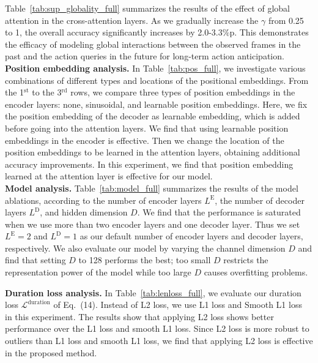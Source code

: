 Table~\ref{tab:sup_globality_full} summarizes the results of the effect of global attention in the cross-attention layers. As we gradually increase the $\gamma$ from 0.25 to 1, the overall accuracy significantly increases by 2.0-3.3\%p.
This demonstrates the efficacy of modeling global interactions between the observed frames in the past and the action queries in the future for long-term action anticipation.
\\
\noindent
\textbf{Position embedding analysis.}
In Table~\ref{tab:pos_full}, we investigate various combinations of different types and locations of the positional embeddings.
From the 1$^\mathrm{st}$ to the 3$^\mathrm{rd}$ rows, we compare three types of position embeddings in the encoder layers: none, sinusoidal, and learnable position embeddings. Here, we fix the position embedding of the decoder as learnable embedding, which is added before going into the attention layers. We find that using learnable position embeddings in the encoder is effective.
Then we change the location of the position embeddings to be learned in the attention layers, obtaining additional accuracy improvements. In this experiment, we find that position embedding learned at the attention layer is effective for our model.
\\
\noindent
\textbf{Model analysis.}
Table~\ref{tab:model_full} summarizes the results of the model ablations, according to the number of encoder layers $L^\textrm{E}$, the number of decoder layers $L^\textrm{D}$, and hidden dimension $D$.
We find that the performance is saturated when we use more than two encoder layers and one decoder layer. Thus we set $L^\textrm{E}=2$ and $L^\textrm{D}=1$ as our default number of encoder layers and decoder layers, respectively.
We also evaluate our model by varying the channel dimension $D$ and find that setting $D$ to 128 performs the best; too small $D$ restricts the representation power of the model while too large $D$ causes overfitting problems.

\noindent
\textbf{Duration loss analysis.}
In Table~\ref{tab:lenloss_full}, we evaluate our duration loss $\mathcal{L}^\mathrm{duration}$ of Eq.~(14). Instead of L2 loss, we use L1 loss and Smooth L1 loss~\cite{girshick2015fast} in this experiment. The results show that applying L2 loss shows better performance over the L1 loss and smooth L1 loss. 
Since L2 loss is more robust to outliers than L1 loss and smooth L1 loss, we find that applying L2 loss is effective in the proposed method.
